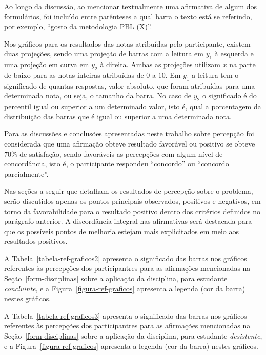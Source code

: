 Ao longo da discussão, ao mencionar textualmente uma afirmativa de
algum dos formulários, foi incluído entre parênteses a qual barra o texto
está se referindo, por exemplo, ``gosto da metodologia PBL (X)''.

Nos gráficos para os resultados das notas atribuídas pelo participante,
existem duas projeções, sendo uma projeção de barras com
a leitura em $y_1$ à esquerda e uma projeção em curva
em $y_2$ à direita.
Ambas as projeções utilizam $x$ na parte de baixo para as notas
inteiras atribuídas de $0$ a $10$.
Em $y_1$ a leitura tem o significado de quantas respostas, valor absoluto,
que foram atribuídas para uma determinada nota, ou seja,
o tamanho da barra.
No caso de $y_2$ o significado é do percentil igual ou superior
a um determinado valor, isto é,
qual a porcentagem da distribuição das barras que é igual ou superior
a uma determinada nota.

Para as discussões e conclusões apresentadas neste trabalho
sobre percepção foi considerada que uma afirmação obteve
resultado favorável ou positivo
se obteve $70\%$ de satisfação,
sendo favoráveis as percepções com algum nível de concordância,
isto é, o participante respondeu ``concordo''
ou ``concordo parcialmente''.

Nas seções a seguir que detalham os resultados de percepção sobre o problema, 
serão discutidos apenas os pontos principais observados,
positivos e negativos, em torno da favorabilidade para o
resultado positivo dentro dos critérios
definidos no parágrafo anterior.
A discordância integral nas afirmativas será destacada para que
os possíveis pontos de melhoria estejam mais explicitados em meio
aos resultados positivos.

A Tabela~\ref{tabela-ref-graficos2} apresenta
o significado das barras nos gráficos referentes às percepções
dos participantres para as afirmações mencionadas
na Seção~\ref{form-disciplinas} sobre a aplicação da disciplina,
para estudante \textit{concluinte},
e a Figura~\ref{figura-ref-graficos} apresenta a legenda (cor da barra)
nestes gráficos.



A Tabela~\ref{tabela-ref-graficos3} apresenta
o significado das barras nos gráficos referentes às percepções
dos participantres para as afirmações mencionadas
na Seção~\ref{form-disciplinas} sobre a aplicação da disciplina,
para estudante \textit{desistente},
e a Figura~\ref{figura-ref-graficos} apresenta a legenda (cor da barra)
nestes gráficos.

